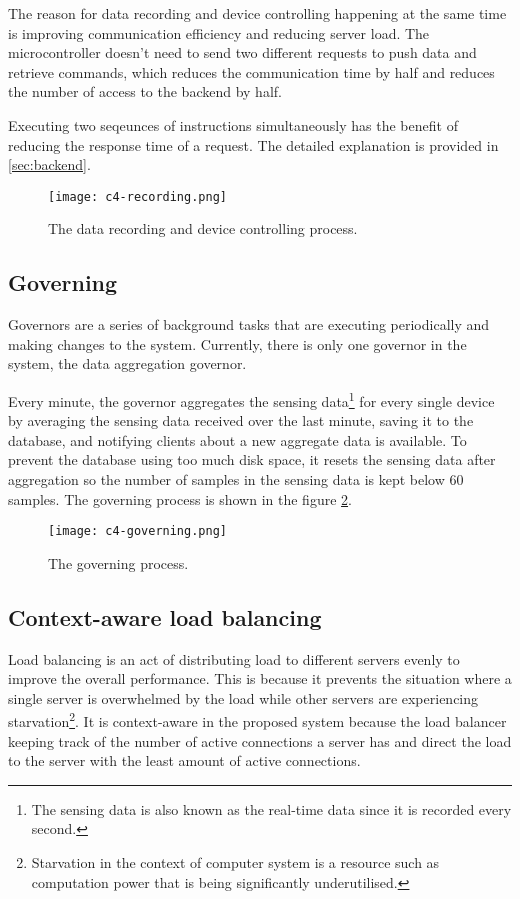 \documentclass[../thesis.tex]{subfiles}
\begin{document}
The reason for data recording and device controlling happening at the same time is improving communication efficiency and reducing server load. The microcontroller doesn't need to send two different requests to push data and retrieve commands, which reduces the communication time by half and reduces the number of access to the backend by half. 

Executing two seqeunces of instructions simultaneously has the benefit of reducing the response time of a request. The detailed explanation is provided in \autoref{sec:backend}.

\begin{figure}[!ht]
	\centering
	\texttt{[image: c4-recording.png]}
	\caption{The data recording and device controlling process.}
	\label{fig:record}
\end{figure}

\subsection{Governing}
\label{sec:governor}

Governors are a series of background tasks that are executing periodically and making changes to the system. Currently, there is only one governor in the system, the data aggregation governor.

Every minute, the governor aggregates the sensing data\footnote{The sensing data is also known as the real-time data since it is recorded every second.} for every single device by averaging the sensing data received over the last minute, saving it to the database, and notifying clients about a new aggregate data is available. To prevent the database using too much disk space, it resets the sensing data after aggregation so the number of samples in the sensing data is kept below 60 samples. The governing process is shown in the figure \ref{fig:governing}.

\begin{figure}[!ht]
	\centering
	\texttt{[image: c4-governing.png]}
	\caption{The governing process.}
	\label{fig:governing}
\end{figure}

\subsection{Context-aware load balancing}

Load balancing is an act of distributing load to different servers evenly to improve the overall performance. This is because it prevents the situation where a single server is overwhelmed by the load while other servers are experiencing starvation\footnote{Starvation in the context of computer system is a resource such as computation power that is being significantly underutilised.}. It is context-aware in the proposed system because the load balancer keeping track of the number of active connections a server has and direct the load to the server with the least amount of active connections. 
\end{document}
